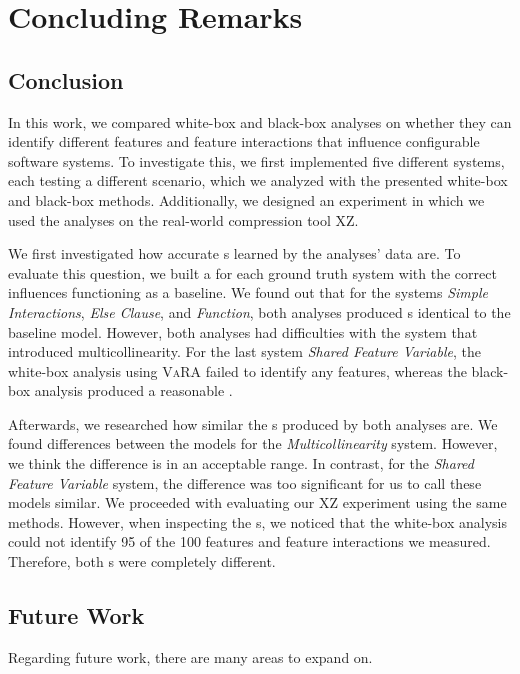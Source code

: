 \chapter{Concluding Remarks}\label{ch:conclusion}

\section{Conclusion}\label{sec:conclusion}
In this work, we compared white-box and black-box analyses on whether they can identify different features and feature interactions 
that influence configurable software systems. To investigate this, we first implemented five different systems,
each testing a different scenario, which we analyzed with the presented white-box and black-box methods. Additionally, 
we designed an experiment in which we used the analyses on the real-world compression tool \textsc{XZ}.

We first investigated how accurate {\perfInfluenceModel}s learned by the analyses' data are. 
To evaluate this question, we built a {\perfInfluenceModel} for each ground truth system with the correct influences functioning as a baseline. 
We found out that for the systems \emph{Simple Interactions}, \emph{Else Clause}, and \emph{Function}, 
both analyses produced {\perfInfluenceModel}s identical to the baseline model. 
However, both analyses had difficulties with the system that introduced multicollinearity. 
For the last system \emph{Shared Feature Variable}, the white-box analysis using \textsc{VaRA} failed to identify any features, 
whereas the black-box analysis produced a reasonable {\perfInfluenceModel}.

Afterwards, we researched how similar the {\perfInfluenceModel}s produced by both analyses are. 
We found differences between the models for the \emph{Multicollinearity} system. 
However, we think the difference is in an acceptable range. In contrast, for the \emph{Shared Feature Variable} system, 
the difference was too significant for us to call these models similar. We proceeded with evaluating our \textsc{XZ} experiment using the same methods. 
However, when inspecting the {\perfInfluenceModel}s, we noticed that the white-box analysis could not identify 95 of the 100 features and 
feature interactions we measured. Therefore, both {\perfInfluenceModel}s were completely different.

\section{Future Work}\label{sec:futurework}
Regarding future work, there are many areas to expand on. 

